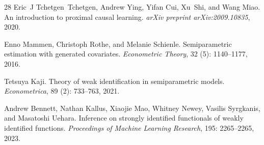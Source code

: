\documentclass[twoside]{article}
\theoremstyle{definition}
\begin{document}
\begin{thebibliography}{28}
Eric~J Tchetgen~Tchetgen, Andrew Ying, Yifan Cui, Xu~Shi, and Wang Miao.
\newblock An introduction to proximal causal learning.
\newblock \emph{arXiv preprint arXiv:2009.10835}, 2020.

Enno Mammen, Christoph Rothe, and Melanie Schienle.
\newblock Semiparametric estimation with generated covariates.
\newblock \emph{Econometric Theory}, 32 (5): 1140--1177, 2016.

Tetsuya Kaji.
\newblock Theory of weak identification in semiparametric models.
\newblock \emph{Econometrica}, 89 (2): 733--763, 2021.

Andrew Bennett, Nathan Kallus, Xiaojie Mao, Whitney Newey, Vasilis Syrgkanis, and Masatoshi Uehara.
\newblock Inference on strongly identified functionals of weakly identified functions.
\newblock \emph{Proceedings of Machine Learning Research}, 195: 2265--2265, 2023.

\end{thebibliography}

\clearpage
\end{document}
